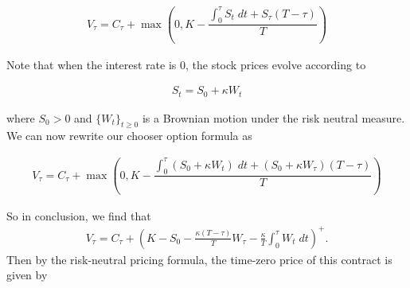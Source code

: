 \documentclass[reqno]{amsart}
\begin{document}
\begin{align}
     V_\tau = C_\tau + \max(0, K - \dfrac{\int_0^\tau S_t \; dt + S_\tau (T - \tau)}{T})
\end{align}

Note that when the interest rate is $0$, the stock prices evolve according to 

\begin{align}
     S_t = S_0 + \kappa W_t
\end{align}

where $S_0 > 0$ and $\{W_t\}_{t \ge 0}$ is a Brownian motion under the risk neutral measure. We can now rewrite our chooser option formula as

\begin{align}
     V_\tau = C_\tau + \max(0, K - \dfrac{\int_0^\tau \left( S_0 + \kappa W_t \right) \; dt + (S_0 + \kappa W_\tau) (T - \tau)}{T})
\end{align}

So in conclusion, we find that 
\begin{align}
     V_\tau = C_\tau + \left(K- S_0 - \frac{\kappa(T-\tau)}{T} W_\tau - \frac{\kappa}{T} \int_0^\tau W_t \; dt  \right)^+.
\end{align}
Then by the risk-neutral pricing formula, the time-zero price of this contract is given by 
\end{document}
